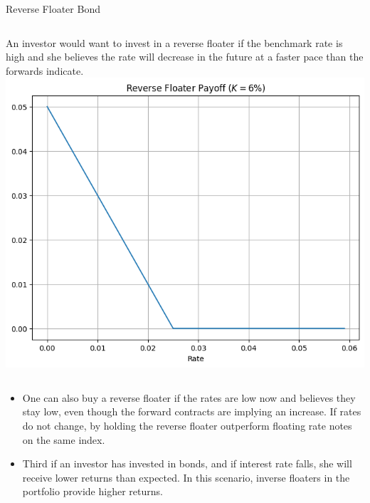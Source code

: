 \documentclass{beamer}
\begin{document}
\begin{frame}{Reverse Floater Bond}
		\begin{columns}
		An investor would want to invest in a reverse floater if the benchmark rate is high and she believes the rate will decrease in the future at a faster pace than the forwards indicate.
				\includegraphics[width=0.8\linewidth]{images/reverse_floater_payoff}
		\end{columns}
	\begin{itemize}
	\item<2-> One can also buy a reverse floater if the rates are low now and believes they stay low, even though the forward contracts are implying an increase. If rates do not change, by holding the reverse floater outperform floating rate notes on the same index.
	\item<3-> Third if an investor has invested in bonds, and if interest rate falls, she will receive lower returns than expected. In this scenario, inverse floaters in the portfolio provide higher returns.
	\end{itemize}
\end{frame}
\end{document}
